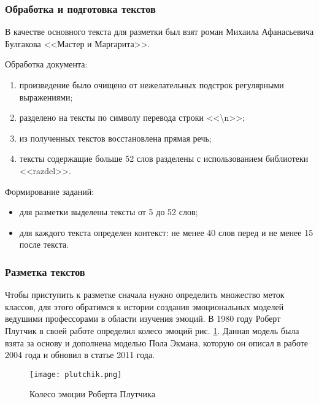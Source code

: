 \subsubsection{Обработка и подготовка текстов}

В качестве основного текста для разметки был взят роман Михаила Афанасьевича Булгакова <<Мастер и Маргарита>>.

\bigskip
Обработка документа:

\bigskip
\begin{enumerate}
\item произведение было очищено от нежелательных подстрок регулярными выражениями;
\item разделено на тексты по символу перевода строки <<\textbackslash n>>;
\item из полученных текстов восстановлена прямая речь;
\item тексты содержащие больше 52 слов разделены с использованием библиотеки <<razdel>>.
\end{enumerate}

\bigskip
Формирование заданий:

\bigskip
\begin{itemize}
 \item для разметки выделены тексты от 5 до 52 слов;
 \item для каждого текста определен контекст:  не менее 40 слов перед и не менее 15 после текста.
\end{itemize}



\subsubsection{Разметка текстов}

Чтобы приступить к разметке сначала нужно определить множество меток классов, для этого обратимся к истории создания эмоциональных моделей ведушими профессорами в области изучения эмоций. В 1980 году Роберт Плутчик в своей работе \cite{Plutchik} определил колесо эмоций рис. \ref{fig:plutchik}. Данная модель была взята за основу и дополнена моделью Пола Экмана, которую он описал в работе \cite{Ekman2004} 2004 года и обновил в статье \cite{Ekman2011} 2011 года.

\begin{figure}[ht]
    \centering
    \texttt{[image: plutchik.png]}
    \caption{Колесо эмоции Роберта Плутчика}
    \label{fig:plutchik}
\end{figure}

